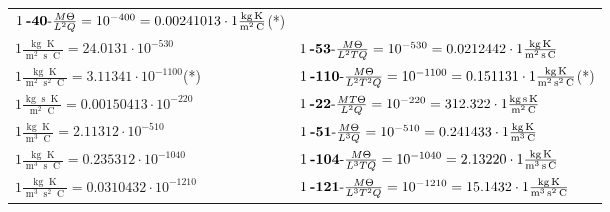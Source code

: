 \begin{center}
\begin{longtable}{l l}
	{\color{black}$1\:\text{\textbf{-40}-} \frac{M\Theta}{L^2Q}=10^{-400} = 0.00241013 \cdot 1 \bm{\mathrm{ }}\frac{\operatorname{kg}\operatorname{K}}{\operatorname{m}^2\operatorname{C}}$}\quad(*)\\
{\color{black}$1 \bm{\mathrm{ }}\frac{\operatorname{kg}\operatorname{K}}{\operatorname{m}^2\operatorname{s}\operatorname{C}} = 24.0131\cdot10^{-530} $}&
	{\color{black}$1\:\text{\textbf{-53}-} \frac{M\Theta}{L^2TQ}=10^{-530} = 0.0212442 \cdot 1 \bm{\mathrm{ }}\frac{\operatorname{kg}\operatorname{K}}{\operatorname{m}^2\operatorname{s}\operatorname{C}}$}\\
{\color{black}$1 \bm{\mathrm{ }}\frac{\operatorname{kg}\operatorname{K}}{\operatorname{m}^2\operatorname{s}^2\operatorname{C}} = 3.11341\cdot10^{-1100} $}\quad(*)&
	{\color{black}$1\:\text{\textbf{-110}-} \frac{M\Theta}{L^2T^2Q}=10^{-1100} = 0.151131 \cdot 1 \bm{\mathrm{ }}\frac{\operatorname{kg}\operatorname{K}}{\operatorname{m}^2\operatorname{s}^2\operatorname{C}}$}\quad(*)\\
{\color{black}$1 \bm{\mathrm{ }}\frac{\operatorname{kg}\operatorname{s}\operatorname{K}}{\operatorname{m}^2\operatorname{C}} = 0.00150413\cdot10^{-220} $}&
	{\color{black}$1\:\text{\textbf{-22}-} \frac{MT\Theta}{L^2Q}=10^{-220} = 312.322 \cdot 1 \bm{\mathrm{ }}\frac{\operatorname{kg}\operatorname{s}\operatorname{K}}{\operatorname{m}^2\operatorname{C}}$}\\
{\color{black}$1 \bm{\mathrm{ }}\frac{\operatorname{kg}\operatorname{K}}{\operatorname{m}^3\operatorname{C}} = 2.11312\cdot10^{-510} $}&
	{\color{black}$1\:\text{\textbf{-51}-} \frac{M\Theta}{L^3Q}=10^{-510} = 0.241433 \cdot 1 \bm{\mathrm{ }}\frac{\operatorname{kg}\operatorname{K}}{\operatorname{m}^3\operatorname{C}}$}\\
{\color{black}$1 \bm{\mathrm{ }}\frac{\operatorname{kg}\operatorname{K}}{\operatorname{m}^3\operatorname{s}\operatorname{C}} = 0.235312\cdot10^{-1040} $}&
	{\color{black}$1\:\text{\textbf{-104}-} \frac{M\Theta}{L^3TQ}=10^{-1040} = 2.13220 \cdot 1 \bm{\mathrm{ }}\frac{\operatorname{kg}\operatorname{K}}{\operatorname{m}^3\operatorname{s}\operatorname{C}}$}\\
{\color{black}$1 \bm{\mathrm{ }}\frac{\operatorname{kg}\operatorname{K}}{\operatorname{m}^3\operatorname{s}^2\operatorname{C}} = 0.0310432\cdot10^{-1210} $}&
	{\color{black}$1\:\text{\textbf{-121}-} \frac{M\Theta}{L^3T^2Q}=10^{-1210} = 15.1432 \cdot 1 \bm{\mathrm{ }}\frac{\operatorname{kg}\operatorname{K}}{\operatorname{m}^3\operatorname{s}^2\operatorname{C}}$}\\

\end{longtable}
\end{center}

